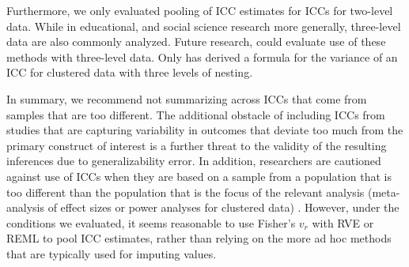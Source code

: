 Furthermore, we only evaluated pooling of ICC estimates for ICCs for two-level data. While in educational, and social science research more generally, three-level data are also commonly analyzed. Future research, could evaluate use of these methods with three-level data. Only \cite{hedgesVarianceIntraclassCorrelations2012} has derived a formula for the variance of an ICC for clustered data with three levels of nesting. 

In summary, we recommend not summarizing across ICCs that come from samples that are too different. The additional obstacle of including ICCs from studies that are capturing variability in outcomes that deviate too much from the primary construct of interest is a further threat to the validity of the resulting inferences due to generalizability error. In addition, researchers are cautioned against use of ICCs when they are based on a sample from a population that is too different than the population that is the focus of the relevant analysis (meta-analysis of effect sizes or power analyses for clustered data) \cite{jacob2010}. However, under the conditions we evaluated, it seems reasonable to use Fisher's $v_r$ with RVE or REML to pool ICC estimates, rather than relying on the more ad hoc methods that are typically used for imputing values.
